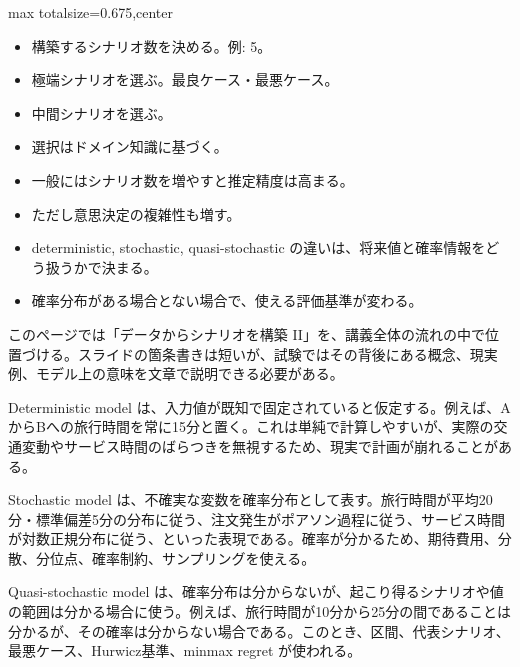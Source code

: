 \clearpage
{}
\begin{adjustbox}{max totalsize={\textwidth}{0.675\textheight},center}
\begin{minipage}{\textwidth}\scriptsize
\begin{minipage}[t]{0.485\textwidth}
\begin{itemize}
\item 構築するシナリオ数を決める。例: 5。
\item 極端シナリオを選ぶ。最良ケース・最悪ケース。
\item 中間シナリオを選ぶ。
\item 選択はドメイン知識に基づく。
\item 一般にはシナリオ数を増やすと推定精度は高まる。
\item ただし意思決定の複雑性も増す。
\end{itemize}
\begin{itemize}
\item deterministic, stochastic, quasi-stochastic の違いは、将来値と確率情報をどう扱うかで決まる。
\item 確率分布がある場合とない場合で、使える評価基準が変わる。
\end{itemize}
\end{minipage}\hfill
\begin{minipage}[t]{0.485\textwidth}
このページでは「データからシナリオを構築 II」を、講義全体の流れの中で位置づける。スライドの箇条書きは短いが、試験ではその背後にある概念、現実例、モデル上の意味を文章で説明できる必要がある。\par
Deterministic model は、入力値が既知で固定されていると仮定する。例えば、AからBへの旅行時間を常に15分と置く。これは単純で計算しやすいが、実際の交通変動やサービス時間のばらつきを無視するため、現実で計画が崩れることがある。\par
Stochastic model は、不確実な変数を確率分布として表す。旅行時間が平均20分・標準偏差5分の分布に従う、注文発生がポアソン過程に従う、サービス時間が対数正規分布に従う、といった表現である。確率が分かるため、期待費用、分散、分位点、確率制約、サンプリングを使える。\par
Quasi-stochastic model は、確率分布は分からないが、起こり得るシナリオや値の範囲は分かる場合に使う。例えば、旅行時間が10分から25分の間であることは分かるが、その確率は分からない場合である。このとき、区間、代表シナリオ、最悪ケース、Hurwicz基準、minmax regret が使われる。\par

\end{minipage}
\end{minipage}
\end{adjustbox}
